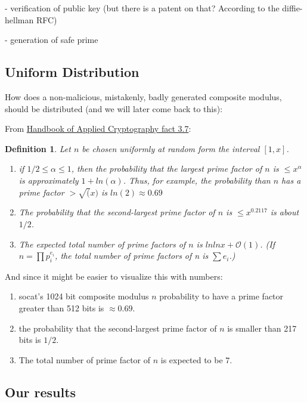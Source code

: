 \documentclass[a4paper,11pt]{article}
\newtheorem{definition}{Definition}
\begin{document}
- verification of public key (but there is a patent on that? According to the diffie-hellman RFC)

- generation of safe prime

\subsection{Uniform Distribution}

How does a non-malicious, mistakenly, badly generated composite modulus, should be distributed (and we will later come back to this):

From \href{http://cacr.uwaterloo.ca/hac/about/chap3.pdf}{Handbook of Applied Cryptography fact 3.7}:

\begin{definition}
    Let $n$ be chosen uniformly at random form the interval $[1, x]$.
    \begin{enumerate}
        \item if $1/2 \leq \alpha \leq 1$, then the probability that the largest prime factor of $n$ is $\leq x^{\alpha}$ is approximately $1+ ln(\alpha)$. Thus, for example, the probability than $n$ has a prime factor $> \sqrt(x)$ is $ln(2) \approx 0.69$
        \item The probability that the second-largest prime factor of $n$ is $\leq x^{0.2117}$ is about $1/2$. 
        \item The expected total number of prime factors of $n$ is $ln ln x + \mathcal{O}(1)$. (If $n = \prod p_i^{e_i}$, the total number of prime factors of n is $\sum e_i$.)
    \end{enumerate} 
\end{definition}

And since it might be easier to visualize this with numbers:

\begin{enumerate}
    \item socat's 1024 bit composite modulus $n$ probability to have a prime factor greater than 512 bits is $\approx 0.69$.
    \item the probability that the second-largest prime factor of $n$ is smaller than 217 bits is $1/2$.
    \item The total number of prime factor of $n$ is expected to be $7$.
\end{enumerate}


\subsection{Our results}
\end{document}
